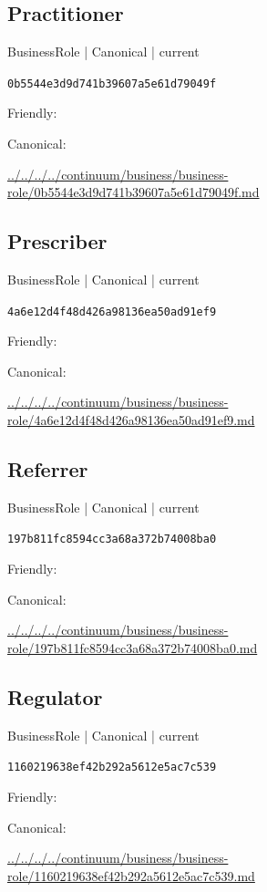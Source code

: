 \documentclass[10pt,a4paper]{article}
\begin{document}
\subsection*{Practitioner}
{\small BusinessRole | Canonical | current}\par
\texttt{0b5544e3d9d741b39607a5e61d79049f}\par
Friendly: \par
Canonical: \par
{\footnotesize\url{../../../../continuum/business/business-role/0b5544e3d9d741b39607a5e61d79049f.md}}\par
\subsection*{Prescriber}
{\small BusinessRole | Canonical | current}\par
\texttt{4a6e12d4f48d426a98136ea50ad91ef9}\par
Friendly: \par
Canonical: \par
{\footnotesize\url{../../../../continuum/business/business-role/4a6e12d4f48d426a98136ea50ad91ef9.md}}\par
\subsection*{Referrer}
{\small BusinessRole | Canonical | current}\par
\texttt{197b811fc8594cc3a68a372b74008ba0}\par
Friendly: \par
Canonical: \par
{\footnotesize\url{../../../../continuum/business/business-role/197b811fc8594cc3a68a372b74008ba0.md}}\par
\subsection*{Regulator}
{\small BusinessRole | Canonical | current}\par
\texttt{1160219638ef42b292a5612e5ac7c539}\par
Friendly: \par
Canonical: \par
{\footnotesize\url{../../../../continuum/business/business-role/1160219638ef42b292a5612e5ac7c539.md}}\par
\end{document}
